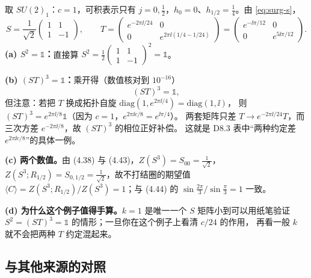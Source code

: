 \begin{derivation}[D8.7：$k=1$ 的手算例子]
取 $SU(2)_1$：$c=1$，可积表示只有 $j=0,\frac12$，$h_0=0$、$h_{1/2}=\frac14$。由 \eqref{eq:surg-s}，
\[
S=\frac{1}{\sqrt2}\begin{pmatrix}1&1\\[2pt]1&-1\end{pmatrix},
\qquad
T=\begin{pmatrix}e^{-2\pi\ii/24}&0\\[2pt]0&e^{2\pi\ii(1/4-1/24)}\end{pmatrix}
=\begin{pmatrix}e^{-\ii\pi/12}&0\\[2pt]0&e^{5\ii\pi/12}\end{pmatrix}.
\]
\textbf{(a) $S^2=\mathbb 1$：}直接算 $S^2=\frac12\begin{pmatrix}1&1\\1&-1\end{pmatrix}^2=\mathbb 1$。

\textbf{(b) $(ST)^3=\mathbb 1$：}乘开得（数值核对到 $10^{-16}$）
\[
(ST)^3=\mathbb 1,
\]
但注意：若把 $T$ 换成拓扑自旋 $\mathrm{diag}(1,e^{2\pi\ii/4})=\mathrm{diag}(1,\ii)$，
则 $(ST)^3=e^{2\pi\ii/8}\mathbb 1$（因为 $c=1$，$e^{2\pi\ii c/8}=e^{\ii\pi/4}$）。
两套矩阵只差 $T\to e^{-2\pi\ii/24}T$，而三次方差 $e^{-2\pi\ii/8}$，故 $(ST)^3$ 的相位正好补偿。
这就是 D8.3 表中“两种约定差 $e^{2\pi\ii c/8}$”的具体一例。

\textbf{(c) 两个数值。}由 (4.38) 与 (4.43)，$Z(S^3)=S_{00}=\frac{1}{\sqrt2}$，
$Z(S^3;R_{1/2})=S_{0,1/2}=\frac{1}{\sqrt2}$，故不打结圈的期望值
$\langle C\rangle=Z(S^3;R_{1/2})/Z(S^3)=1$；与 (4.44) 的
$\sin\frac{2\pi}{3}\big/\sin\frac{\pi}{3}=1$ 一致。\ours

\textbf{(d) 为什么这个例子值得手算。}$k=1$ 是唯一一个 $S$ 矩阵小到可以用纸笔验证
$S^2=(ST)^3=\mathbb 1$ 的情形；一旦你在这个例子上看清 $c/24$ 的作用，
再看一般 $k$ 就不会把两种 $T$ 约定混起来。
\end{derivation}

\subsection{与其他来源的对照}

